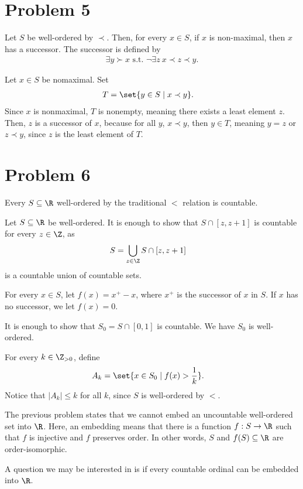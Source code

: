 \documentclass[10pt]{mypackage}
\begin{document}
\section{Problem 5}%
\begin{problem}
  Let $S$ be well-ordered by $\prec$. Then, for every $x\in S$, if $x$ is non-maximal, then $x$ has a successor. The successor is defined by
  \begin{align*}
    \exists y\succ x\text{ s.t. }\lnot\exists z~x \prec z \prec y.
  \end{align*}
\end{problem}
\begin{solution}
  Let $x\in S$ be nomaximal. Set
  \begin{align*}
    T &= \set{y\in S\mid x\prec y}.
  \end{align*}
  Since $x$ is nonmaximal, $T$ is nonempty, meaning there exists a least element $z$. Then, $z$ is a successor of $x$, because for all $y$, $x\prec y$, then $y\in T$, meaning $y=z$ or $z \prec y$, since $z$ is the least element of $T$.
\end{solution}
\section{Problem 6}%
\begin{problem}
  Every $S\subseteq \R$ well-ordered by the traditional $<$ relation is countable.
\end{problem}
\begin{solution}
  Let $S\subseteq \R$ be well-ordered. It is enough to show that $S\cap [z,z+1]$ is countable for every $z\in \Z$, as
  \begin{align*}
    S &= \bigcup_{z\in \Z}S\cap \left[z,z+1\right]
  \end{align*}
  is a countable union of countable sets.\newline

  For every $x\in S$, let $f(x) = x^{+} - x$, where $x^{+}$ is the successor of $x$ in $S$. If $x$ has no successor, we let $f(x) = 0$.\newline

  It is enough to show that $S_0 = S\cap [0,1]$ is countable. We have $S_0$ is well-ordered.\newline

  For every $k\in \Z_{>0}$, define
  \begin{align*}
    A_k &= \set{x\in S_0\mid f(x) > \frac{1}{k}}.
  \end{align*}
  Notice that $\left\vert A_k \right\vert \leq k$ for all $k$, since $S$ is well-ordered by $<$.
\end{solution}
\begin{remark}
  The previous problem states that we cannot embed an uncountable well-ordered set into $\R$. Here, an embedding means that there is a function $f: S\rightarrow \R$ such that $f$ is injective and $f$ preserves order. In other words, $S$ and $f(S)\subseteq \R$ are order-isomorphic.\newline

  A question we may be interested in is if every countable ordinal can be embedded into $\R$.
\end{remark}
\end{document}
